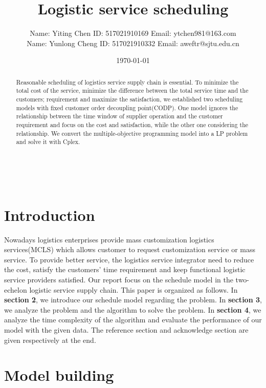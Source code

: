 \documentclass[12pt,a4paper]{article}
\title{Logistic service scheduling}
\author{Name: Yiting Chen  ID: 517021910169 Email: ytchen981@163.com\\
Name: Yunlong Cheng   ID: 517021910332 Email: aweftr@sjtu.edu.cn
 }
\date{\today}
\begin{document}
\maketitle
\begin{abstract}
Reasonable scheduling of logistics service supply chain is essential. To minimize the total cost of the service, minimize the difference between the total service time and the customers; requirement and maximize the satisfaction, we established two scheduling models with fixed customer order decoupling point(CODP). One model ignores the relationship between the time window of supplier operation and the customer requirement and focus on the cost and satisfaction, while the other one considering the relationship. We convert the multiple-objective programming model into a LP problem and solve it with Cplex.
\end{abstract}
\renewcommand{\contentsname}{catalog}
\tableofcontents
\newpage
\ \\
\section{Introduction}
Nowadays logistics enterprises provide mass customization logistics services(MCLS) which allows customer to  request customization service or mass service. To provide better service, the logistics service integrator need to reduce the cost, satisfy the customers' time requirement and keep functional logistic service providers satisfied. Our report focus on the schedule model in the two-echelon logistic service supply chain. This paper is organized as follows. In \textbf{section 2}, we introduce our schedule model regarding the problem. In \textbf{section 3}, we analyze the problem and the algorithm to solve the problem. In \textbf{section 4}, we analyze the time complexity of the algorithm and evaluate the performance of our model with the given data. The reference section and acknowledge section are given respectively at the end.

\section{Model building}
\end{document}
